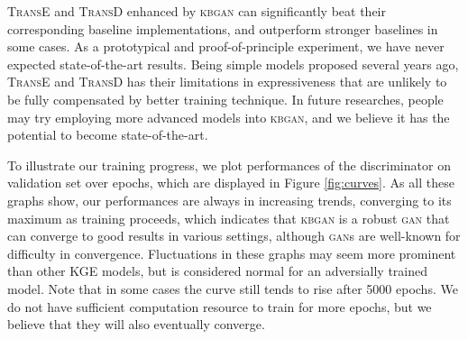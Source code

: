 \documentclass[11pt,a4paper]{article}
\begin{document}
\textsc{TransE} and \textsc{TransD} enhanced by \textsc{kbgan} can significantly beat their corresponding baseline implementations, and outperform stronger baselines in some cases. As a prototypical and proof-of-principle experiment, we have never expected state-of-the-art results. Being simple models proposed several years ago, \textsc{TransE} and \textsc{TransD} has their limitations in expressiveness that are unlikely to be fully compensated by better training technique. In future researches, people may try employing more advanced models into \textsc{kbgan},  and we believe it has the potential to become state-of-the-art.

To illustrate our training progress, we plot performances of the discriminator on validation set over epochs, which are displayed in Figure \ref{fig:curves}. As all these graphs show, our performances are always in increasing trends, converging to its maximum as training proceeds, which indicates that \textsc{kbgan} is a robust \textsc{gan} that can converge to good results in various settings, although \textsc{gan}s are well-known for difficulty in convergence. Fluctuations in these graphs may seem more prominent than other KGE models, but is considered normal for an adversially trained model. Note that in some cases the curve still tends to rise after 5000 epochs. We do not have sufficient computation resource to train for more epochs, but we believe that they will also eventually converge.


\end{document}
